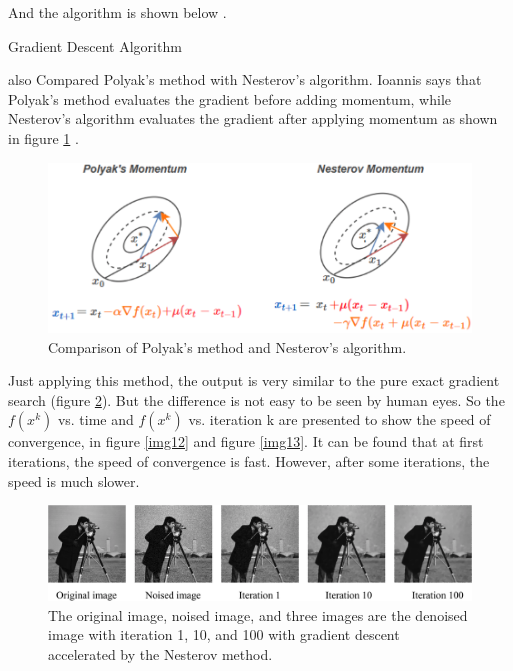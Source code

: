 \documentclass{article}
\makeatletter
\def\BState{\State\hskip-\ALG@thistlm}
\makeatother
\begin{document}
And the algorithm is shown below \citep{Ioannis2018}.

\begin{algorithm}
\caption{Gradient Descent Algorithm}\label{alg1}
\begin{algorithmic}
\BState \emph{given} a starting point $x \in \operatorname{dom} f$, learning rate $\delta_{k}$
\BState \emph{repeat}:
\State 1. $z_{k+1}=x_{k}-t_{k} \nabla f\left(x_{k}\right)$
\State 2. $x_{k+1}=z_{k+1}+\delta_{k}\left(z_{k+1}-z_{k}\right) \quad \delta_{k} \in[0,1)$
\State 3. Line search. Choose step size $t$ via exact or backtracking line search.
\State 4. Update. $x:=x_{k+1}(t_{k})$ 
\BState \emph{until} stopping criterion is satisfied.
\EndProcedure
\end{algorithmic}
\end{algorithm}

\citet{Ioannis2018} also Compared Polyak’s method with Nesterov’s algorithm. Ioannis says that Polyak’s method evaluates the gradient before adding momentum, while Nesterov’s algorithm evaluates the gradient after applying momentum as shown in figure \ref{img10} \citep{Ioannis2018}.

\begin{figure}[h]
  \includegraphics[width=4.5in]{pic10.png}
  \centering
  \caption{Comparison of Polyak’s method and Nesterov’s algorithm.}
  \label{img10}
\end{figure}

Just applying this method, the output is very similar to the pure exact gradient search (figure \ref{img11}). But the difference is not easy to be seen by human eyes. So the $f(x^{k})$ vs. time and  $f(x^{k})$ vs. iteration k are presented to show the speed of convergence, in figure \ref{img12} and figure \ref{img13}. It can be found that at first iterations, the speed of convergence is fast. However, after some iterations, the speed is much slower.

\begin{figure}[h]
  \includegraphics[width=5in]{pic11.png}
  \centering
  \caption{The original image, noised image, and three images are the denoised image with iteration 1, 10, and 100 with gradient descent accelerated by the Nesterov method.}
  \label{img11}
\end{figure}
\end{document}
